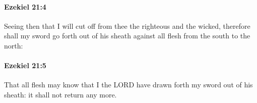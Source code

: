 		\paragraph{Ezekiel 21:4} %
			\label{EZEKIEL-21-4}

			Seeing then that I will cut off from thee the righteous and the wicked, therefore shall my sword go forth out of his sheath against all flesh from the south to the north:


		\paragraph{Ezekiel 21:5} %
			\label{EZEKIEL-21-5}

			That all flesh may know that I the LORD have drawn forth my sword out of his sheath: it shall not return any more.


